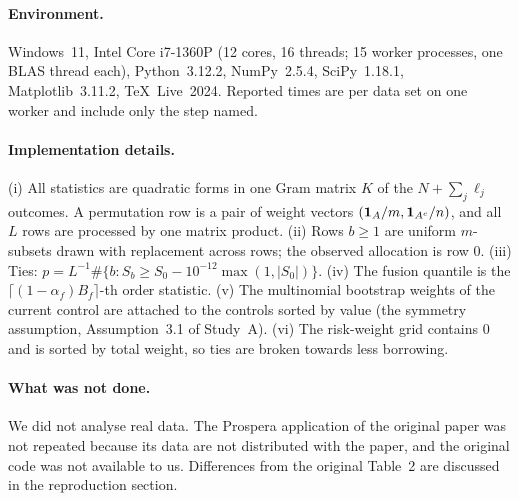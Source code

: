 \paragraph{Environment.} Windows~11, Intel Core i7-1360P (12 cores, 16 threads; 15 worker processes, one BLAS thread each), Python~3.12.2, NumPy~2.5.4, SciPy~1.18.1, Matplotlib~3.11.2, TeX~Live~2024. Reported times are per data set on one worker and include only the step named.

\paragraph{Implementation details.} (i) All statistics are quadratic forms in one Gram matrix $K$ of the $N+\sum_j\ell_j$ outcomes. A permutation row is a pair of weight vectors $(\mathbf{1}_{A}/m,\mathbf{1}_{A^c}/n)$, and all $L$ rows are processed by one matrix product. (ii) Rows $b\ge1$ are uniform $m$-subsets drawn with replacement across rows; the observed allocation is row $0$. (iii) Ties: $p=L^{-1}\#\{b:S_b\ge S_0-10^{-12}\max(1,|S_0|)\}$. (iv) The fusion quantile is the $\lceil(1-\alpha_f)B_f\rceil$-th order statistic. (v) The multinomial bootstrap weights of the current control are attached to the controls sorted by value (the symmetry assumption, Assumption~3.1 of Study~A). (vi) The risk-weight grid contains $0$ and is sorted by total weight, so ties are broken towards less borrowing.

\paragraph{What was not done.} We did not analyse real data. The Prospera application of the original paper was not repeated because its data are not distributed with the paper, and the original code was not available to us. Differences from the original Table~2 are discussed in the reproduction section.
